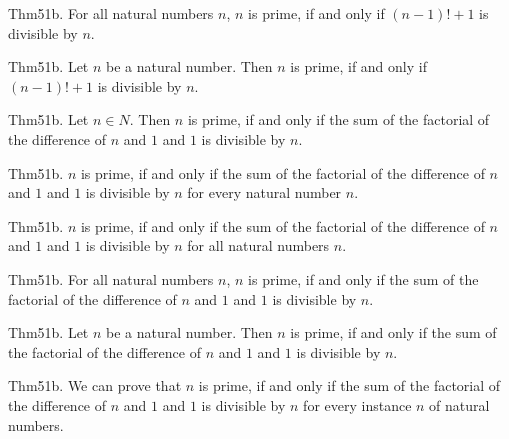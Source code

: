 \documentclass{article}
\begin{document}
Thm51b. For all natural numbers $n$, $n$ is prime, if and only if $(n - 1)! + 1$ is divisible by $n$.

Thm51b. Let $n$ be a natural number. Then $n$ is prime, if and only if $(n - 1)! + 1$ is divisible by $n$.

Thm51b. Let $n \in N$. Then $n$ is prime, if and only if the sum of the factorial of the difference of $n$ and $1$ and $1$ is divisible by $n$.

Thm51b. $n$ is prime, if and only if the sum of the factorial of the difference of $n$ and $1$ and $1$ is divisible by $n$ for every natural number $n$.

Thm51b. $n$ is prime, if and only if the sum of the factorial of the difference of $n$ and $1$ and $1$ is divisible by $n$ for all natural numbers $n$.

Thm51b. For all natural numbers $n$, $n$ is prime, if and only if the sum of the factorial of the difference of $n$ and $1$ and $1$ is divisible by $n$.

Thm51b. Let $n$ be a natural number. Then $n$ is prime, if and only if the sum of the factorial of the difference of $n$ and $1$ and $1$ is divisible by $n$.

Thm51b. We can prove that $n$ is prime, if and only if the sum of the factorial of the difference of $n$ and $1$ and $1$ is divisible by $n$ for every instance $n$ of natural numbers.
\end{document}

